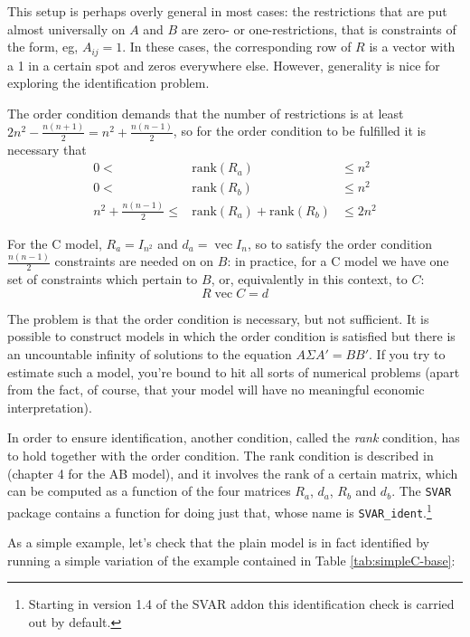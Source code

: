 \documentclass[a4paper,10pt]{article}
\DeclareMathOperator{\VEC}{\mathrm{vec}}
\newcommand{\rk}[1]{\mathrm{rank}\left(#1\right)}
\begin{document}
This setup is perhaps overly general in most cases: the restrictions
that are put almost universally on $A$ and $B$ are zero- or
one-restrictions, that is constraints of the form, eg, $A_{ij} = 1$. In
these cases, the corresponding row of $R$ is a vector with a 1 in a
certain spot and zeros everywhere else. However, generality is nice
for exploring the identification problem.

The order condition demands that the number of restrictions is at
least $2 n^2 - \frac{n (n+1)}{2} = n^2 + \frac{n (n-1)}{2}$, so for
the order condition to be fulfilled it is necessary that
\begin{eqnarray*}
  0 < & \rk{R_a} & \le n^2 \\
  0 < & \rk{R_b} & \le n^2 \\
  n^2 + \frac{n (n-1)}{2} \le & \rk{R_a} + \rk{R_b} & \le 2 n^2
\end{eqnarray*}

For the C model, $R_a = I_{n^2}$ and $d_a = \VEC I_n$, so to satisfy
the order condition $\frac{n (n-1)}{2}$ constraints are needed on on
$B$: in practice, for a C model we have one set of constraints which
pertain to $B$, or, equivalently in this context, to $C$:
\begin{equation}
  \label{eq:ImpConstC}
  R \VEC C = d
\end{equation}

The problem is that the order condition is necessary, but not
sufficient. It is possible to construct models in which the order
condition is satisfied but there is an uncountable infinity of
solutions to the equation $A \Sigma A' = B B'$. If you try to estimate
such a model, you're bound to hit all sorts of numerical problems
(apart from the fact, of course, that your model will have no
meaningful economic interpretation).

In order to ensure identification, another condition, called the
\emph{rank} condition, has to hold together with the order
condition. The rank condition is described in \cite{AG} (chapter 4 for
the AB model), and it involves the rank of a certain matrix, which can
be computed as a function of the four matrices $R_a$, $d_a$, $R_b$ and
$d_b$. The \texttt{SVAR} package contains a function for doing just
that, whose name is \texttt{SVAR\_ident}.\footnote{Starting in version 1.4 
of the SVAR addon this identification check is carried out by default.}

As a simple example, let's check that the plain model is in fact
identified by running a simple variation of the example contained in
Table \ref{tab:simpleC-base}: 
\end{document}
